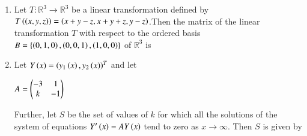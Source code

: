 \documentclass[journal]{IEEEtran}
\begin{document}
\begin{enumerate}
\begin{enumerate}
\end{enumerate}
\item Let $T: \mathbb{R}^3 \rightarrow \mathbb{R}^3$ be a linear transformation defined by $T\left(\left(x, y, z\right)\right) = \left(x + y - z, x + y + z, y - z\right)$.Then the matrix of the linear transformation $T$ with respect to the ordered basis $B = \left\{\left(0, 1, 0\right), \left(0, 0, 1\right), \left(1, 0, 0\right)\right\}$ of $\mathbb{R}^3$ is  
\begin{enumerate}
\end{enumerate}
\item Let $Y\left(x\right) = \left(y_1\left(x\right), y_2\left(x\right)\right)^T$ and let \\ \begin{center}$A = \begin{pmatrix}-3 & 1 \\k & -1\end{pmatrix}$ \end{center}Further, let $S$ be the set of values of $k$ for which all the solutions of the system of equations $Y^{\prime}\left(x\right) = A Y\left(x\right)$ tend to zero as $x \rightarrow \infty$. Then $S$ is given by
\begin{enumerate}
\end{enumerate}
\end{enumerate}
\end{document}
